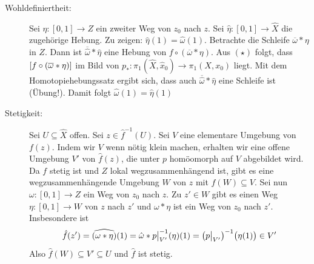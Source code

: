 \begin{description}
	\item[Wohldefiniertheit:] Sei $\eta : [0,1] \to Z$ ein zweiter Weg von $z_0$ nach $z$. Sei $\hat{\eta} : [0,1] \to \hat{X}$ die zugehörige Hebung. Zu zeigen: 
	$\hat{\eta}(1) = \hat{\omega}(1)$. Betrachte die Schleife $\overline{\omega} * \eta$ in $Z$. Dann ist $\overline{\hat{\omega}} * \hat{\eta}$ eine Hebung von
	$f \circ (\overline{\omega} * \eta)$. Aus $(\star)$ folgt, dass $\benbrace*{f \circ (\overline{\omega} * \eta )}$ im Bild von 
	$p_* : \pi_1(\hat{X}, \hat{x}_0) \to \pi_1(X,x_0)$ 
	liegt. Mit dem Homotopiehebungssatz ergibt sich, dass auch $\overline{\hat{\omega}} * \hat{\eta}$ eine Schleife ist (Übung!). Damit folgt 
	$\hat{\omega}(1)= \hat{\eta}(1)$
	\item[Stetigkeit:] Sei $U \subseteq \hat{X}$ offen. Sei $z \in \hat{f} ^{-1} (U)$. Sei $V$ eine elementare Umgebung von $f(z)$. Indem wir $V$ wenn nötig klein machen,
	erhalten wir eine offene Umgebung $V'$ von $\hat{f}(z)$, die unter $p$ homöomorph auf $V$ abgebildet wird. Da $f$ stetig ist und $Z$ lokal wegzusammenhängend ist, gibt
	es eine wegzusammenhängende Umgebung $W$ von $z$ mit $f(W) \subseteq V$. Sei nun $\omega : [0,1] \to Z$ ein Weg von $z_0$ nach $z$. Zu $z' \in W$ gibt es einen Weg
	$\eta : [0,1] \to W$ von $z$ nach $z'$ und $\omega * \eta$ ist ein Weg von $z_0$ nach $z'$. Insbesondere ist 
	\[
		\hat{f}(z') = \widehat{(\omega * \eta)} (1)= \hat{\omega} * p\big|_{V'} ^{-1} (\eta) (1) = \enbrace*{p \big|_{V'}} ^{-1} \enbrace[\big]{\eta(1)} \in V'  
	\]
	Also $\hat{f}(W) \subseteq V' \subseteq U$ und $\hat{f}$ ist stetig. \bewende
\end{description}

